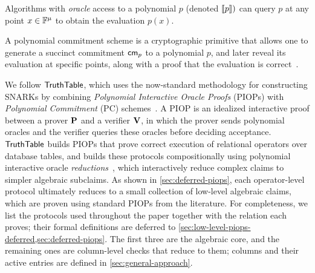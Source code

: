 Algorithms with \emph{oracle} access to a polynomial $p$ (denoted $\llbracket p\rrbracket)$ can query $p$ at any point $x \in \mathbb{F}^{\mu}$ to obtain the evaluation $p(x)$.

 A polynomial commitment scheme is a cryptographic primitive that allows one to generate a succinct commitment $\mathsf{cm}_p$ to a polynomial $p$, and later reveal its evaluation at specific points, along with a proof that the evaluation is correct~\cite{KateZG10}. 

We follow $\mathsf{TruthTable}$, which uses the now-standard methodology for constructing SNARKs by combining \emph{Polynomial Interactive Oracle Proofs} (PIOPs) with \emph{Polynomial Commitment} (PC) schemes~\cite{BunzFS20,ChiesaHMMVW20}. A PIOP is an idealized interactive proof between a prover $\bf{P}$ and a verifier $\bf{V}$, in which the prover sends polynomial oracles and the verifier queries these oracles before deciding acceptance. 
$\mathsf{TruthTable}$ builds PIOPs that prove correct execution of relational operators over database tables, and builds these protocols compositionally using polynomial interactive oracle \emph{reductions}~\cite{BenSassonCGGRS19,BunzMNW25b,BawejaMMS25}, which interactively reduce complex claims to simpler algebraic subclaims. As shown in \cref{sec:deferred-piops}, each operator-level protocol ultimately reduces to a small collection of low-level algebraic claims, which are proven using standard PIOPs from the literature. For completeness, we list the protocols used throughout the paper together with the relation each proves; their formal definitions are deferred to \cref{sec:low-level-piops-deferred,sec:deferred-piops}. The first three are the algebraic core, and the remaining ones are column-level checks that reduce to them; columns and their active entries are defined in \cref{sec:general-approach}.

